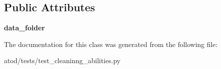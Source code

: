 \subsection*{Public Attributes}
\begin{DoxyCompactItemize}
\item 
{\bfseries data\+\_\+folder}\hypertarget{classatod_1_1tests_1_1test__cleaninng__abilities_1_1_test_cleaning_abilities_abb4ac6e2e4a689dbed98de8cb35fa5fd}{}\label{classatod_1_1tests_1_1test__cleaninng__abilities_1_1_test_cleaning_abilities_abb4ac6e2e4a689dbed98de8cb35fa5fd}

\end{DoxyCompactItemize}


The documentation for this class was generated from the following file\+:\begin{DoxyCompactItemize}
\item 
atod/tests/test\+\_\+cleaninng\+\_\+abilities.\+py\end{DoxyCompactItemize}
